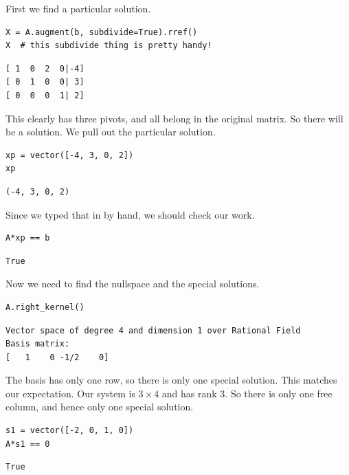 \documentclass[10pt,]{book}
\theoremstyle{plain}
\numberwithin{equation}{section}
\begin{document}
        First we find a particular solution.
\begin{lstlisting}[style=sageinput]
X = A.augment(b, subdivide=True).rref()
X  # this subdivide thing is pretty handy!
\end{lstlisting}
\begin{lstlisting}[style=sageoutput]
[ 1  0  2  0|-4]
[ 0  1  0  0| 3]
[ 0  0  0  1| 2]
\end{lstlisting}
\par

        This clearly has three pivots, and all belong in the original matrix.
        So there will be a solution. We pull out the particular solution.
\begin{lstlisting}[style=sageinput]
xp = vector([-4, 3, 0, 2])
xp
\end{lstlisting}
\begin{lstlisting}[style=sageoutput]
(-4, 3, 0, 2)
\end{lstlisting}
\par

        Since we typed that in by hand, we should check our work.
\begin{lstlisting}[style=sageinput]
A*xp == b
\end{lstlisting}
\begin{lstlisting}[style=sageoutput]
True
\end{lstlisting}
\par

        Now we need to find the nullspace and the special solutions.
\begin{lstlisting}[style=sageinput]
A.right_kernel()
\end{lstlisting}
\begin{lstlisting}[style=sageoutput]
Vector space of degree 4 and dimension 1 over Rational Field
Basis matrix:
[   1    0 -1/2    0]
\end{lstlisting}
\par

        The basis has only one row, so there is only one special solution.
        This matches our expectation. Our system is \(3\times 4\) and has
        rank \(3\). So there is only one free column, and hence only one
        special solution.
\begin{lstlisting}[style=sageinput]
s1 = vector([-2, 0, 1, 0])
A*s1 == 0
\end{lstlisting}
\begin{lstlisting}[style=sageoutput]
True
\end{lstlisting}
\par
\end{document}
